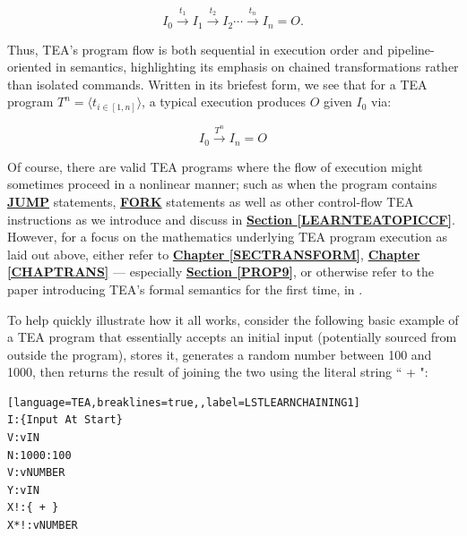 \documentclass[a4paper, 18pt]{book} %
\begin{document}
{{{\begin{appendices}
\[
I_0 \xrightarrow{t_1} I_1 \xrightarrow{t_2} I_2 \cdots \xrightarrow{t_n} I_n = O.
\]


Thus, TEA’s program flow is both sequential in execution order and pipeline-oriented in semantics, highlighting its emphasis on chained transformations rather than isolated commands. Written in its briefest form, we see that for a TEA program $T^n = \langle t_{i\in [1,n]} \rangle$, a typical execution produces $O$ given $I_0$ via:

 
 \vspace{2em}
\[
I_0 \xrightarrow{T^n} I_n = O
\]
\vspace{2em}

Of course, there are valid TEA programs where the flow of execution might sometimes proceed in a nonlinear manner; such as when the program contains \textbf{\hyperref[CHAPJ]{JUMP}} statements, \textbf{\hyperref[SECF]{FORK}} statements as well as other control-flow TEA instructions as we introduce and discuss in  \textbf{\hyperref[LEARNTEATOPICCF]{Section \ref{LEARNTEATOPICCF}}}. However, for a focus on the mathematics underlying TEA program execution as laid out above, either refer to \textbf{\hyperref[SECTRANSFORM]{Chapter \ref{SECTRANSFORM}}}, \textbf{\hyperref[CHAPTRANS]{Chapter \ref{CHAPTRANS}}} --- especially \textbf{\hyperref[PROP9]{Section \ref{PROP9}}}, or otherwise refer to the paper introducing TEA's formal semantics for the first time, in \cite{lutalo_2026_teapaper_zenodo}.


\vspace{2em}

To help quickly illustrate how it all works, consider the following basic example of a TEA program that essentially accepts an initial input (potentially sourced from outside the program), stores it, generates a random number between 100 and 1000, then returns the result of joining the two using the literal string `` + ":


\vspace{2em}

  \begin{tcolorbox}[teaterminalstyle, title=LEARN PROGRAMMING: Program Flow in TEA via Sequence-Transformer Chaining Demo V1, breakable]
  \begin{lstlisting}[language=TEA,breaklines=true,,label=LSTLEARNCHAINING1]
I:{Input At Start}
V:vIN
N:1000:100 
V:vNUMBER
Y:vIN
X!:{ + }
X*!:vNUMBER
   \end{lstlisting}
  \end{tcolorbox}
\vspace{2em}



\end{appendices}}}}
\end{document}
